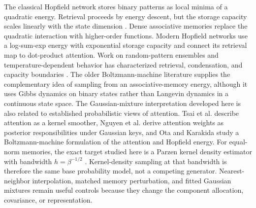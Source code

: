 
The classical Hopfield network \cite{hopfieldNeuralNetworksPhysical1982}
stores binary patterns as local minima of a quadratic energy. Retrieval
proceeds by energy descent, but the storage capacity scales linearly with the
state dimension \cite{amitStoringInfiniteNumbers1985}. Dense associative
memories \cite{krotovDenseAssociativeMemory2016,krotovLargeAssociativeMemory2021}
replace the quadratic interaction with higher-order functions. Modern Hopfield
networks \cite{ramsauerHopfieldNetworksAll2021} use a log-sum-exp energy with
exponential storage capacity and connect its retrieval map to dot-product
attention. Work on random-pattern ensembles and temperature-dependent behavior
has characterized retrieval, condensation, and capacity boundaries
\cite{lucibelloExponentialCapacityDense2024,koulischerExploringTemperatureDependent2023}.
The older Boltzmann-machine literature
\cite{ackleyLearningAlgorithmBoltzmann1985} supplies the complementary idea of
sampling from an associative-memory energy, although it uses Gibbs dynamics on
binary states rather than Langevin dynamics in a continuous state space. The
Gaussian-mixture interpretation developed here is also related to established
probabilistic views of attention. Tsai et al.
\cite{tsaiTransformerKernel2019} describe attention as a kernel smoother,
Nguyen et al.
\cite{nguyenProbabilisticKeys2022} derive attention weights as posterior
responsibilities under Gaussian keys, and Ota and Karakida
\cite{otaAttentionBoltzmannMachine2023} study a Boltzmann-machine formulation
of the attention and Hopfield energy. For equal-norm memories, the exact target
studied here is a Parzen kernel density estimator with bandwidth
$h=\beta^{-1/2}$ \cite{parzenEstimationProbability1962}. Kernel-density
sampling at that bandwidth is therefore the same base probability model, not a
competing generator. Nearest-neighbor interpolation, matched memory
perturbation, and fitted Gaussian mixtures remain useful controls because they
change the component allocation, covariance, or representation.

